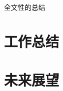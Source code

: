 \documentclass[../main.tex]{subfiles}
\begin{document}
\begin{conclusion}

全文性的总结

\section*{工作总结}


\section*{未来展望}


\end{conclusion}
\end{document}
